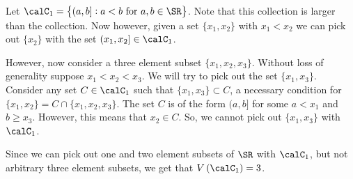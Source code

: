 \begin{example*}
	\label{ex:vc-indices-2}
	Let \(\calC_1 = \left\{(a,b]:a<b\text{ for } a,b \in \SR\right\}\). Note that this collection is larger than the collection. Now however, given a set \(\{x_1,x_2\} \) with \(x_1 < x_2\) we can pick out \(\{x_2\}\) with the set \((x_1,x_2]\in\calC_1\).

	However, now consider a three element subset \(\{x_1,x_2,x_3\}\). Without loss of generality suppose \(x_1 < x_2 < x_3\). We will try to pick out the set \(\{x_1,x_3\}\). Consider any set \(C\in \calC_1\) such that \(\{x_1,x_3\}\subset C \), a necessary condition for \(\{x_1,x_2\} = C \cap \{x_1,x_2,x_3\}\). The set \(C\) is of the form \((a,b]\) for some \(a < x_1\) and \(b \geq x_3\). However, this means that \(x_2 \in C\). So, we cannot pick out \(\{x_1,x_3\} \) with \(\calC_1\). 

	Since we can pick out one and two element subsets of \(\SR\) with \(\calC_1\), but not arbitrary three element subsets, we get that \(V\left(\calC_1\right)=3\).
\end{example*}


